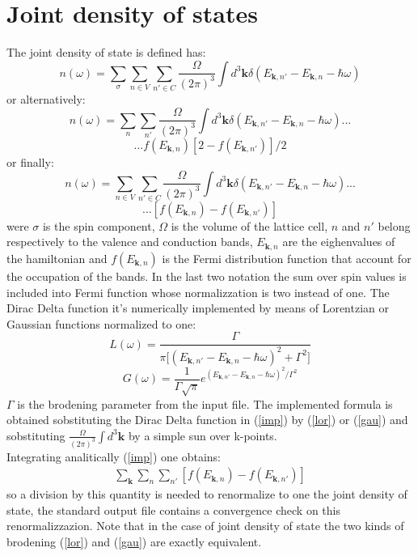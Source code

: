 \documentclass[twocolumn]{article}
\begin{document}
\section{Joint density of states}
The joint density of state is defined has:
\begin{displaymath}
n(\omega)=\sum_{\sigma}\sum_{n\in V}\sum_{n'\in C}\frac{\Omega}{(2\pi)^3}\int d^3\textbf{k}\delta(E_{\textbf{k},n'}-E_{\textbf{k},n}
-\hbar\omega)
\end{displaymath}
or alternatively:
\begin{equation}
n(\omega)=\sum_{n}\sum_{n'}\frac{\Omega}{(2\pi)^3}\int d^3\textbf{k}\delta(E_{\textbf{k},n'}-E_{\textbf{k},n}
-\hbar\omega)...
\label{imp2}
\end{equation}
\begin{displaymath}
...f(E_{\textbf{k},n})[2-f(E_{\textbf{k},n'})]/2
\end{displaymath}
or finally:
\begin{equation}
n(\omega)=\sum_{n\in V}\sum_{n'\in C}\frac{\Omega}{(2\pi)^3}\int d^3\textbf{k}\delta(E_{\textbf{k},n'}-E_{\textbf{k},n}
-\hbar\omega)...
\label{imp}
\end{equation}
\begin{displaymath}
...[f(E_{\textbf{k},n})-f(E_{\textbf{k},n'})]
\end{displaymath}
were $\sigma$ is the spin component, $\Omega$ is the volume of the lattice cell, $n$ and $n'$ belong respectively to the
valence and conduction bands,
$E_{\textbf{k},n}$ are the eighenvalues of the hamiltonian and $f(E_{\textbf{k},n})$ is the Fermi distribution function
that account for the occupation of the bands. In the last two notation the sum over spin values is included into
Fermi function whose normalizzation is two instead of one.
The Dirac Delta function it's numerically implemented by means of Lorentzian
or Gaussian functions normalized to one:
\begin{equation}
L(\omega)=\frac{\Gamma}{\pi\big[(E_{\textbf{k},n'}-E_{\textbf{k},n}-\hbar\omega)^2+\Gamma^2\big]}
\label{lor}
\end{equation}
\begin{equation}
G(\omega)=\frac{1}{\Gamma\sqrt{\pi}}e^{(E_{\textbf{k},n'}-E_{\textbf{k},n}-\hbar\omega)^2/\Gamma^2}
\label{gau}
\end{equation}
$\Gamma$ is the brodening parameter from the input file. The implemented formula is obtained sobstituting the
Dirac Delta function in (\ref{imp}) by (\ref{lor}) or (\ref{gau}) and sobstituting $\frac{\Omega}{(2\pi)^3}\int
d^3\textbf{k}$ by a simple sun over k-points.\\
Integrating analitically (\ref{imp}) one obtains:
\begin{eqnarray}
\sum_{\textbf{k}}\sum_{n}\sum_{n'}[f(E_{\textbf{k},n})-f(E_{\textbf{k},n'})]
\end{eqnarray}
so a division by this quantity is needed to renormalize to one the joint density of state, the standard output file
contains a convergence check on this renormalizzazion. Note that in the case of
joint density of state the two kinds of brodening (\ref{lor}) and (\ref{gau}) are exactly equivalent.
\end{document}
